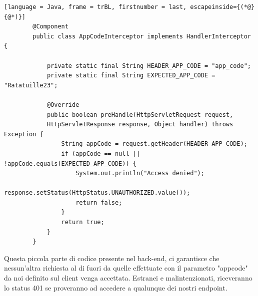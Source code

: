     \begin{lstlisting}[language = Java, frame = trBL, firstnumber = last, escapeinside={(*@}{@*)}]
        @Component
        public class AppCodeInterceptor implements HandlerInterceptor {

            private static final String HEADER_APP_CODE = "app_code";
            private static final String EXPECTED_APP_CODE = "Ratatuille23";

            @Override
            public boolean preHandle(HttpServletRequest request, 
            HttpServletResponse response, Object handler) throws Exception {
                String appCode = request.getHeader(HEADER_APP_CODE);
                if (appCode == null || !appCode.equals(EXPECTED_APP_CODE)) {
                    System.out.println("Access denied");
                    response.setStatus(HttpStatus.UNAUTHORIZED.value());
                    return false;
                }
                return true;
            }
        }
    \end{lstlisting}
    

    \begin{flushleft}
        Questa piccola parte di codice presente nel back-end, ci garantisce che nessun'altra richiesta al di fuori da 
        quelle effettuate con il parametro "appcode" da noi definito sul client venga accettata.
        Estranei e malintenzionati, riceveranno lo status 401 se proveranno ad accedere a qualunque dei nostri endpoint.
    \end{flushleft}

   
        
    